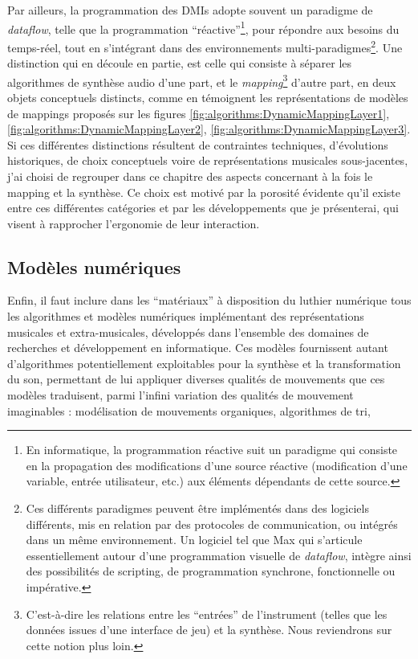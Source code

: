 \indent Par ailleurs, la programmation des \glspl{DMI} adopte souvent un paradigme de \textit{dataflow}, telle que la programmation ``réactive''\footnote{En informatique, la programmation réactive suit un paradigme qui consiste en la propagation des modifications d'une source réactive (modification d'une variable, entrée utilisateur, etc.) aux éléments dépendants de cette source.}, pour répondre aux besoins du temps-réel, tout en s'intégrant dans des environnements multi-paradigmes\footnote{Ces différents paradigmes peuvent être implémentés dans des logiciels différents, mis en relation par des protocoles de communication, ou intégrés dans un même environnement. Un logiciel tel que Max qui s'articule essentiellement autour d'une programmation visuelle de \textit{dataflow}, intègre ainsi des possibilités de scripting, de programmation synchrone, fonctionnelle ou impérative.}. Une distinction qui en découle en partie, est celle qui consiste à séparer les algorithmes de synthèse audio d'une part, et le \textit{mapping}\footnote{C'est-à-dire les relations entre les ``entrées'' de l'instrument (telles que les données issues d'une interface de jeu) et la synthèse. Nous reviendrons sur cette notion plus loin.} d'autre part, en deux objets conceptuels distincts, comme en témoignent les représentations de modèles de mappings proposés sur les figures \ref{fig:algorithms:DynamicMappingLayer1}, \ref{fig:algorithms:DynamicMappingLayer2}, \ref{fig:algorithms:DynamicMappingLayer3}.\\
\indent Si ces différentes distinctions résultent de contraintes techniques, d'évolutions historiques, de choix conceptuels voire de représentations musicales sous-jacentes, j'ai choisi de regrouper dans ce chapitre des aspects concernant à la fois le mapping et la synthèse. Ce choix est motivé par la porosité évidente qu'il existe entre ces différentes catégories et par les développements que je présenterai, qui visent à rapprocher l'ergonomie de leur interaction.


\subsection{Modèles numériques}
\label{ch:algorithms:digital-material:models}

Enfin, il faut inclure dans les ``matériaux'' à disposition du luthier numérique tous les algorithmes et modèles numériques implémentant des représentations musicales et extra-musicales, développés dans l'ensemble des domaines de recherches et développement en informatique. Ces modèles fournissent autant d'algorithmes potentiellement exploitables pour la synthèse et la transformation du son, permettant de lui appliquer diverses qualités de mouvements que ces modèles traduisent, parmi l'infini variation des qualités de mouvement imaginables : modélisation de mouvements organiques, algorithmes de tri, 



